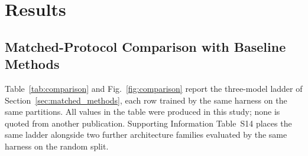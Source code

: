 \documentclass[fleqn,10pt]{wlscirep}
\begin{document}
\section{Results}
\label{sec:results}

\subsection{Matched-Protocol Comparison with Baseline Methods}
\label{sec:matched}

Table~\ref{tab:comparison} and Fig.~\ref{fig:comparison} report the
three-model ladder of Section~\ref{sec:matched_methods}, each row trained by the
same harness on the same partitions.  All values in the table were produced in
this study; none is quoted from another publication.  Supporting Information
Table~S14 places the same ladder alongside two further architecture families
evaluated by the same harness on the random split.

\begin{table}[htbp]
\centering
\caption{Matched-protocol comparison on the Davis dataset (binary
  classification, $K_d < \SI{30}{nM}$).  Every model was trained in this study
  under one shared partition, seed, optimiser, schedule, loss and
  validation-selected threshold; no value is quoted from another publication.
  ``PLM'' indicates whether the model consumes the frozen
  \texttt{esm2\_t30\_150M\_UR50D} residue representation used by BioInteract.
  Best value in each column is in \textbf{bold}.  The Drug-ID-held-out columns
  are shown for completeness but are not used to rank the models: the shared
  early-stopping patience halted every run on that protocol at a first-epoch
  checkpoint (Section~\ref{sec:matched}).  Per-run provenance is given in
  Supporting Information Table~S16.}
\label{tab:comparison}
\end{table}
\end{document}
